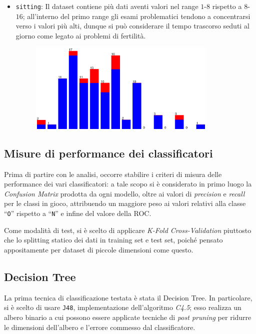 \begin{itemize}
\begin{figure}[H]
    \end{figure}
  \item \texttt{sitting}:
    Il dataset contiene più dati aventi valori nel range \(1\)-\(8\) rispetto a \(8\)-\(16\);
    all'interno del primo range gli esami problematici tendono a concentrarsi verso i valori più alti, dunque si può considerare il tempo trascorso seduti al giorno come legato ai problemi di fertilità.
    \begin{figure}[H]
      \centering
      \includegraphics[width=0.85\textwidth]{fig/sit-discrete.eps}
    \end{figure}
\end{itemize}

\subsection{Misure di performance dei classificatori}

Prima di partire con le analisi, occorre stabilire i criteri di misura delle performance dei vari classificatori:
a tale scopo si è considerato in primo luogo la \emph{Confusion Matrix} prodotta da ogni modello, oltre ai valori di \emph{precision} e \emph{recall} per le classi in gioco, attribuendo un maggiore peso ai valori relativi alla classe ``\texttt{O}'' rispetto a ``\texttt{N}'' e infine del valore della \emph{}{ROC}\@.

Come modalità di test, si è scelto di applicare \emph{K-Fold Cross-Validation} piuttosto che lo splitting statico dei dati in training set e test set, poiché pensato appositamente per dataset di piccole dimensioni come questo.

\subsection{Decision Tree}\label{subsec:tree}

La prima tecnica di classificazione testata è stata il Decision Tree.
In particolare, si è scelto di usare \texttt{J48}, implementazione dell'algoritmo \emph{C4.5};
esso realizza un albero binario a cui possono essere applicate tecniche di \emph{post pruning}
per ridurre le dimensioni dell'albero e l'errore commesso dal classificatore.

